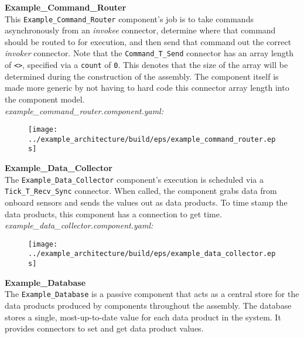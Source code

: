 \textbf{Example\_Command\_Router} \\

This \texttt{Example\_Command\_Router} component's job is to take commands asynchronously from an \textit{invokee} connector, determine where that command should be routed to for execution, and then send that command out the correct \textit{invoker} connector. Note that the \texttt{Command\_T\_Send} connector has an array length of \texttt{<>}, specified via a \texttt{count} of \texttt{0}. This denotes that the size of the array will be determined during the construction of the assembly. The component itself is made more generic by not having to hard code this connector array length into the component model. \\

\textit{example\_command\_router.component.yaml:}

\begin{figure}[H]
  \texttt{[image: ../example\_architecture/build/eps/example\_command\_router.eps]}
\end{figure}

\textbf{Example\_Data\_Collector} \\

The \texttt{Example\_Data\_Collector} component's execution is scheduled via a \texttt{Tick\_T\_Recv\_Sync} connector. When called, the component grabs data from onboard sensors and sends the values out as data products. To time stamp the data products, this component has a connection to get time. \\

\textit{example\_data\_collector.component.yaml:}

\begin{figure}[H]
  \texttt{[image: ../example\_architecture/build/eps/example\_data\_collector.eps]}
\end{figure}

\textbf{Example\_Database} \\

The \texttt{Example\_Database} is a passive component that acts as a central store for the data products produced by components throughout the assembly. The database stores a single, most-up-to-date value for each data product in the system. It provides connectors to set and get data product values. \\


